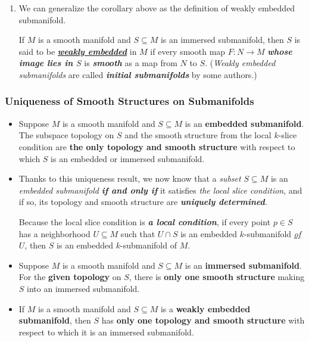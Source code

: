 \documentclass[11pt]{article}
\begin{document}
\begin{itemize}
\begin{remark}
\begin{enumerate}
\item We can generalize the corollary above as the definition of weakly embedded submanifold.
\begin{definition}
If $M$ is a smooth manifold and $S \subseteq M$ is an immersed submanifold, then $S$ is said to be \underline{\emph{\textbf{weakly embedded}}} in $M$ if every smooth map $F: N \rightarrow M$ \emph{\textbf{whose image lies in $S$}} is \textbf{\emph{smooth}} as a map from $N$ to $S$. (\emph{Weakly embedded submanifolds} are called \emph{\textbf{initial submanifolds}} by some authors.) 
\end{definition}
\end{enumerate}
\end{remark}
\end{itemize}

\subsubsection{Uniqueness of Smooth Structures on Submanifolds}
\begin{itemize}
\item \begin{theorem}
Suppose $M$ is a smooth manifold and $S \subseteq M$ is an \textbf{embedded submanifold}. The subspace topology on $S$ and the smooth structure from the local $k$-slice condition are \textbf{the only topology and smooth structure} with respect to which $S$ is an embedded or immersed submanifold.
\end{theorem}

\item \begin{remark}
Thanks to this uniqueness result, we now know that a \emph{subset} $S \subseteq M$ is an \emph{embedded submanifold} \emph{\textbf{if and only if}} it satisfies \emph{the local slice condition}, and if so, its topology and smooth structure are \emph{\textbf{uniquely determined}}.

Because the local slice condition is \emph{\textbf{a local condition}}, if every point $p \in S$ has a neighborhood \underline{$U \subseteq M$} such that \underline{$U \cap S$} is an embedded $k$-submanifold \underline{\emph{of $U$}}, then $S$ is an embedded $k$-submanifold of $M$.
\end{remark}

\item \begin{theorem}
Suppose $M$ is a smooth manifold and $S \subseteq M$ is an \textbf{immersed submanifold}. For the \textbf{given topology} on $S$, there is \textbf{only one smooth structure} making $S$ into an immersed submanifold.
\end{theorem}

\item \begin{theorem} If $M$ is a smooth manifold and $S \subseteq M$ is a \textbf{weakly embedded submanifold}, then $S$ has \textbf{only one topology and smooth structure} with respect to which it is an immersed submanifold.
\end{theorem}
\end{itemize}
\end{document}
